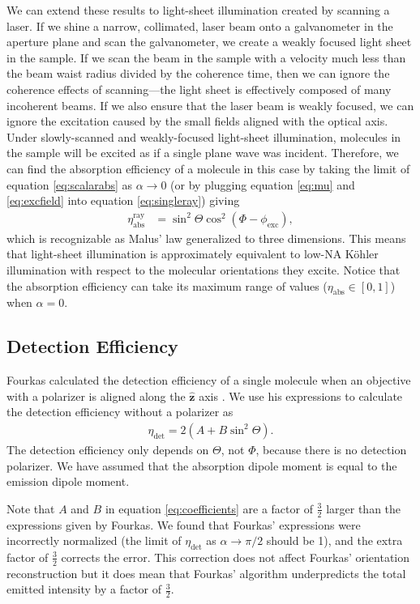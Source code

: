 \documentclass[10pt]{article}
\providecommand{\mh}[1]{\mathbf{\hat{#1}}}
\begin{document}
We can extend these results to light-sheet illumination created by scanning a
laser. If we shine a narrow, collimated, laser beam onto a galvanometer in the
aperture plane and scan the galvanometer, we create a weakly focused light sheet
in the sample. If we scan the beam in the sample with a velocity much less than
the beam waist radius divided by the coherence time, then we can ignore the
coherence effects of scanning---the light sheet is effectively composed of many
incoherent beams. If we also ensure that the laser beam is weakly focused, we
can ignore the excitation caused by the small fields aligned with the optical
axis. Under slowly-scanned and weakly-focused light-sheet illumination,
molecules in the sample will be excited as if a single plane wave was
incident. Therefore, we can find the absorption efficiency of a molecule in this
case by taking the limit of equation \ref{eq:scalarabs} as
$\alpha \rightarrow 0$ (or by plugging equation \ref{eq:mu} and
\ref{eq:excfield} into equation \ref{eq:singleray}) giving
\begin{align}
  \eta_{\text{abs}}^{\text{ray}} &= \sin^2\Theta\cos^2(\Phi - \phi_{\text{exc}}),
\end{align}
which is recognizable as Malus' law generalized to three dimensions. This means
that light-sheet illumination is approximately equivalent to low-NA K\"ohler
illumination with respect to the molecular orientations they excite. Notice that
the absorption efficiency can take its maximum range of values
($\eta_{\text{abs}} \in [0, 1]$) when $\alpha=0$.

\subsection{Detection Efficiency}\label{detection}
Fourkas calculated the detection efficiency of a single molecule when an
objective with a polarizer is aligned along the $\mh{z}$ axis
\cite{fourkas2001}. We use his expressions to calculate the detection efficiency
without a polarizer as
\begin{align}
  \eta_{\text{det}} = 2(A + B\sin^2\Theta). \label{eq:scalardet}
\end{align}
The detection efficiency only depends on $\Theta$, not $\Phi$, because there is
no detection polarizer. We have assumed that the absorption dipole moment is
equal to the emission dipole moment.

Note that $A$ and $B$ in equation \ref{eq:coefficients} are a factor of
$\frac{3}{2}$ larger than the expressions given by Fourkas. We found that
Fourkas' expressions were incorrectly normalized (the limit of
$\eta_{\text{det}}$ as $\alpha\rightarrow \pi/2$ should be 1), and the extra
factor of $\frac{3}{2}$ corrects the error. This correction does not affect
Fourkas' orientation reconstruction but it does mean that Fourkas' algorithm
underpredicts the total emitted intensity by a factor of $\frac{3}{2}$.
\end{document}
